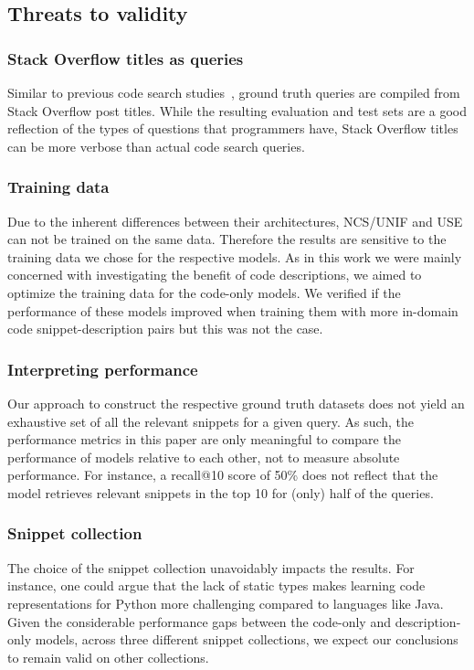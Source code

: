 \documentclass[12pt,conference, onecolumn]{IEEEtran}
\begin{document}
\subsection*{Threats to validity}
\subsubsection*{Stack Overflow titles as queries}
Similar to previous code search studies~\cite{sachdev2018retrieval, cambronero2019deep, yao2019coacor}, ground truth queries are compiled from Stack Overflow post titles. While the resulting evaluation and test sets are a good reflection of the types of questions that programmers have, Stack Overflow titles can be more verbose than actual code search queries.

\subsubsection*{Training data}
Due to the inherent differences between their architectures, NCS/UNIF and USE can not be trained on the same data. Therefore the results are sensitive to the training data we chose for the respective models. As in this work we were mainly concerned with investigating the benefit of code descriptions, we aimed to optimize the training data for the code-only models. We verified if the performance of these models improved when training them with more in-domain code snippet-description pairs but this was not the case.

\subsubsection*{Interpreting performance}
Our approach to construct the respective ground truth datasets does not yield an exhaustive set of all the relevant snippets for a given query.  As such, the performance metrics in this paper are only meaningful to compare the performance of models relative to each other, not to measure absolute performance. For instance, a recall@10 score of 50\% does not reflect that the model retrieves relevant snippets in the top 10 for (only) half of the queries. 

\subsubsection*{Snippet collection}
The choice of the snippet collection unavoidably impacts the results. For instance, one could argue that the lack of static types makes learning code representations for Python more challenging compared to languages like Java. Given the considerable performance gaps between the code-only and description-only models, across three different snippet collections, we expect our conclusions to remain valid on other collections.
 
\end{document}
